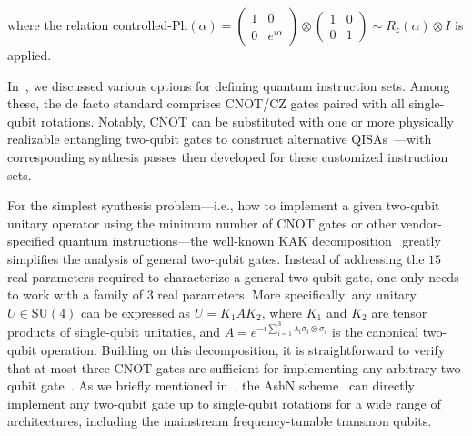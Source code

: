 \documentclass[a4paper,onecolumn,11pt,unpublished]{quantumarticle}
\begin{document}
where the relation controlled-$\mathrm{Ph}(\alpha) = \begin{pmatrix}
  1 & 0 \\ 0 & e^{i\alpha}
\end{pmatrix} \otimes \begin{pmatrix}
  1 & 0 \\ 0 & 1
\end{pmatrix} \sim R_z(\alpha)\otimes I$ is applied.

In~, we discussed various options for defining quantum instruction sets. Among these, the de facto standard comprises CNOT/CZ gates paired with all single-qubit rotations. Notably, CNOT can be substituted with one or more physically realizable entangling two-qubit gates to construct alternative QISAs~\cite{harrow2008exact}---with corresponding synthesis passes then developed for these customized instruction sets.  

For the simplest synthesis problem---i.e., how to implement a given two-qubit unitary operator using the minimum number of CNOT gates or other vendor-specified quantum instructions---the well-known KAK decomposition~\cite{Khaneja2001Cartan} greatly simplifies the analysis of general two-qubit gates. Instead of addressing the $15$ real parameters required to characterize a general two-qubit gate, one only needs to work with a family of $3$ real parameters. More specifically, any unitary $U \in \mathrm{SU}(4)$ can be expressed as $U = K_1 A K_2$, where $K_1$ and $K_2$ are tensor products of single-qubit unitaties, and $A = e^{-i\sum_{i=1}^3 \lambda_i\sigma_i\otimes\sigma_i}$ is the canonical two-qubit operation. Building on this decomposition, it is straightforward to verify that at most three CNOT gates are sufficient for implementing any arbitrary two-qubit gate~\cite{Vidal2004Universal}. As we briefly mentioned in~, the AshN scheme~\cite{Chen2024One} can directly implement any two-qubit gate up to single-qubit rotations for a wide range of architectures, including the mainstream frequency-tunable transmon qubits.
\end{document}
